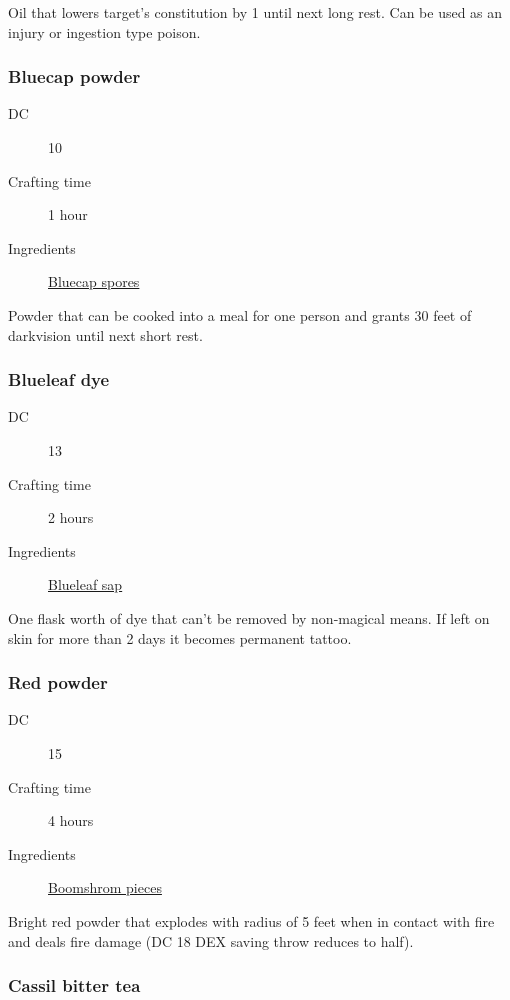 Oil that lowers target's constitution by 1 until next long rest. Can be used as an injury or ingestion type poison.

\subsubsection{Bluecap powder}
\label{Bluecap powder}

\begin{description}
\item [DC] 10
\item [Crafting time] 1 hour
\item [Ingredients] \hyperref[Bluecap]{Bluecap spores}
\end{description}

Powder that can be cooked into a meal for one person and grants 30 feet of darkvision until next short rest.

\subsubsection{Blueleaf dye}
\label{Blueleaf dye}

\begin{description}
\item [DC] 13
\item [Crafting time] 2 hours
\item [Ingredients] \hyperref[Blueleaf]{Blueleaf sap}
\end{description}

One flask worth of dye that can't be removed by non-magical means. 
If left on skin for more than 2 days it becomes permanent tattoo.

\subsubsection{Red powder}
\label{Red powder}

\begin{description}
\item [DC] 15
\item [Crafting time] 4 hours
\item [Ingredients] \hyperref[Boomsrhoom]{Boomshrom pieces}
\end{description}

Bright red powder that explodes with radius of 5 feet when in contact with fire and deals  fire damage (DC 18 DEX saving throw reduces to half).

\subsubsection{Cassil bitter tea}
\label{Cassil bitter tea}

